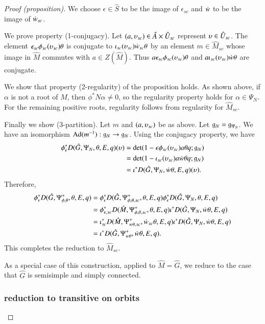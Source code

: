 \begin{proof}[Proof (proposition)]
  We choose $\epsilon\in \hat S$ to be the image of $\epsilon_{sc}$
  and $\dot w$ to be the image of $\dot w_{sc}$.

  We prove property (1-conjugacy).  Let $(a,\upsilon_{sc})\in \hat A\times
  \hat U_{sc}$ represent $\upsilon\in \hat U_{sc}$.  The element
  $\epsilon_{sc}\phi_{sc}(\upsilon_{sc}) \theta$ is conjugate to
  $\iota_{sc}(\upsilon_{sc})\dot w_{sc}\theta$ by an element $m\in\hat
  M_{sc}$ whose image in $\hat M$ commutes with $a\in Z(\hat M)$.
  Thus $a \epsilon_{sc}\phi_{sc}(\upsilon_{sc}) \theta$ and
  $a\iota_{sc}(\upsilon_{sc})\dot w\theta$ are conjugate.

  We show that property (2-regularity) of the proposition holds.  As
  shown above, if $\alpha$ is not a root of $\hat M$, then
  $\phi^*N\alpha\ne 0$, so the regularity property holds for
  $\alpha\in\Psi_N$.  For the remaining positive roots, regularity
  follows from regularity for $\hat M_{sc}$.

  Finally we show (3-partition).  Let $m$ and $(a,\upsilon_{sc})$ be as
  above.  Let ${\mathfrak g}_N = {\mathfrak g}_{\Psi_N}$.  We have an isomorphism
  ${\operatorname{Ad}}(m^{-1}):{\mathfrak g}_N\to {\mathfrak g}_N$.  Using the conjugacy property, we
  have
    \begin{align*}
      \phi_\epsilon^* D(\hat G,\Psi_N,\theta,E,q)(\upsilon) &=
      \det(1-\epsilon \phi_{sc}(\upsilon_{sc}) a \theta q;{\mathfrak g}_N) \\
      &=
      \det(1-  \iota_{sc}(\upsilon_{sc})  a \dot w\theta q;{\mathfrak g}_N) \\
      &=
      \iota^* D(\hat G,\Psi_N,\dot w\theta,E,q)(\upsilon).
      \end{align*}
Therefore,
\begin{align*}
\phi_\epsilon^* D(\hat G,\Psi_{\phi,\theta}^+,\theta,E,q) &=
\phi_\epsilon^* D(\hat G,\Psi_{\phi,\theta,sc}^+,\theta,E,q)
\phi_\epsilon^* D(\hat G,\Psi_N,\theta,E,q) \\
&=
\phi_{\epsilon,sc}^* D(\hat M,\Psi_{\phi,\theta,sc}^+,\theta,E,q)
\iota^* D(\hat G,\Psi_N,\dot w\theta,E,q)\\
&=
\iota_{sc}^* D(\hat M,\Psi_{w\theta,sc}^+,\dot w_{sc}\theta,E,q)
\iota^* D(\hat G,\Psi_N,\dot w\theta,E,q)\\
&=
\iota^* D(\hat G,\Psi_{w\theta}^+,\dot w\theta,E,q).
\end{align*}
This completes the reduction to $\hat M_{sc}$.    

As a special case of this construction, applied to $\hat M=\hat G$, we
reduce to the case that $\hat G$ is semisimple and simply connected.

\subsubsection{reduction to transitive on orbits}


\end{proof}
